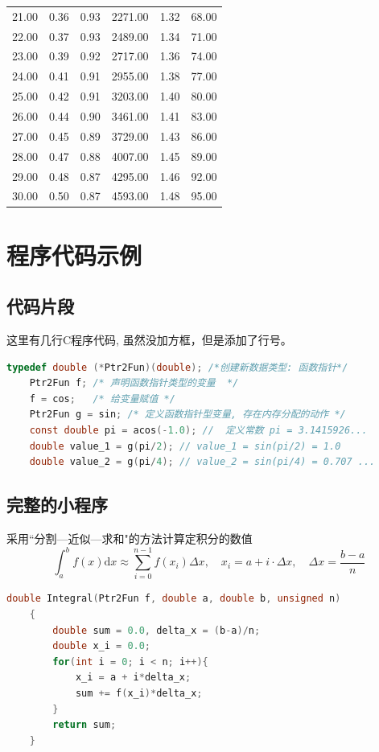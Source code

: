 \begin{landscape}
\begin{longtable}{cm{4cm}ccp{4cm}c}
		21.00 & 0.36 & 0.93 & 2271.00 & 1.32 & 68.00\\
		22.00 & 0.37 & 0.93 & 2489.00 & 1.34 & 71.00\\
		23.00 & 0.39 & 0.92 & 2717.00 & 1.36 & 74.00\\
		24.00 & 0.41 & 0.91 & 2955.00 & 1.38 & 77.00\\
		25.00 & 0.42 & 0.91 & 3203.00 & 1.40 & 80.00\\
		26.00 & 0.44 & 0.90 & 3461.00 & 1.41 & 83.00\\
		27.00 & 0.45 & 0.89 & 3729.00 & 1.43 & 86.00\\
		28.00 & 0.47 & 0.88 & 4007.00 & 1.45 & 89.00\\
		29.00 & 0.48 & 0.87 & 4295.00 & 1.46 & 92.00\\
		30.00 & 0.50 & 0.87 & 4593.00 & 1.48 & 95.00\\
		\hline
	\end{longtable}
\end{landscape}
\newpage 

\section{程序代码示例}

\subsection{代码片段}
这里有几行C程序代码, 虽然没加方框，但是添加了行号。
\begin{lstlisting}[language=C]
	typedef double (*Ptr2Fun)(double); /*创建新数据类型: 函数指针*/
	Ptr2Fun f; /* 声明函数指针类型的变量  */
	f = cos;   /* 给变量赋值 */
	Ptr2Fun g = sin; /* 定义函数指针型变量, 存在内存分配的动作 */
	const double pi = acos(-1.0); //  定义常数 pi = 3.1415926... 
	double value_1 = g(pi/2); // value_1 = sin(pi/2) = 1.0  
	double value_2 = g(pi/4); // value_2 = sin(pi/4) = 0.707 ... 
\end{lstlisting}

\subsection{完整的小程序}
采用``分割---近似---求和"的方法计算定积分的数值
$$
\int^b_a f(x) \mathrm{d} x \approx \sum^{n-1}_{i=0} f(x_i)\Delta x, \quad x_i = a+i\cdot \Delta x, \quad \Delta x = \frac{b-a}{n}
$$
\begin{lstlisting}[language=C,frame=shadowbox,title={Integral-1.c}]
	double Integral(Ptr2Fun f, double a, double b, unsigned n)
	{
		double sum = 0.0, delta_x = (b-a)/n;
		double x_i = 0.0;
		for(int i = 0; i < n; i++){
			x_i = a + i*delta_x;
			sum += f(x_i)*delta_x;
		}
		return sum; 				
	}
\end{lstlisting}

